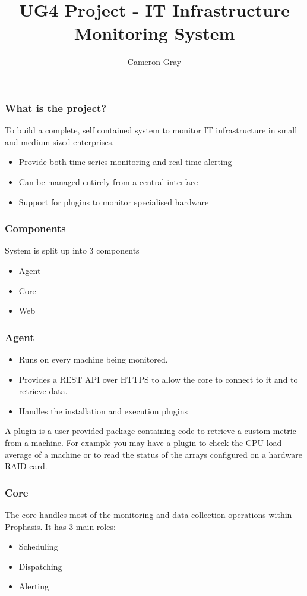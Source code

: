 \documentclass{beamer}
\author{Cameron Gray}
\title{UG4 Project - IT Infrastructure Monitoring System}
\begin{document}
	\frame{\titlepage}
	\begin{frame}
		\frametitle{What is the project?}
		To build a complete, self contained system to monitor IT infrastructure in small and
		medium-sized enterprises.
		\pause
		\begin{itemize}
			\item Provide both time series monitoring and real time alerting
			\pause
			\item Can be managed entirely from a central interface
			\pause
			\item Support for plugins to monitor specialised hardware
		\end{itemize}
	\end{frame}
		
	\begin{frame}
		\frametitle{Components}
		System is split up into 3 components
		\begin{itemize}
			\item Agent
			\item Core
			\item Web
		\end{itemize}
	\end{frame}
		
	\begin{frame}[t]
		\frametitle{Agent}
		\begin{itemize}
			\item Runs on every machine being monitored.
			\item Provides a REST API over HTTPS to allow the core to connect to it and to
				retrieve data.
			\item Handles the installation and execution plugins				
		\end{itemize}	
		\pause
		\begin{definition}[Plugin]
			A plugin is a user provided package containing code to retrieve a custom metric
			from a machine.  For example you may have a plugin to check the CPU load average
			of a machine or to read the status of the arrays configured on a hardware RAID
			card.
		\end{definition}			
	\end{frame}
	
	\begin{frame}
		\frametitle{Core}
		The core handles most of the monitoring and data collection operations within Prophasis.
		It has 3 main roles:
		\begin{itemize}
			\item Scheduling
			\item Dispatching
			\item Alerting
		\end{itemize}
	\end{frame}
	
\end{document}
